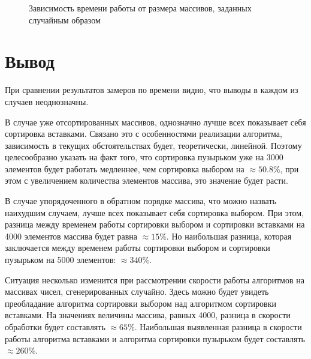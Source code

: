 \documentclass[12pt]{report}
\begin{document}
\begin{figure}[h]
\begin{center}
	\captionsetup{justification=centering}
	\caption{Зависимость времени работы от размера массивов, заданных случайным образом}
	\label{timeRes3}
	\end{center}
\end{figure}

\newpage

\section*{Вывод}
При сравнении результатов замеров по времени видно, что выводы в каждом из случаев неоднозначны.

В случае уже отсортированных массивов, однозначно лучше всех показывает себя сортировка вставками. Связано это с особенностями реализации алгоритма, зависимость в текущих обстоятельствах будет, теоретически, линейной. Поэтому целесообразно указать на факт того, что сортировка пузырьком уже на 3000 элементов будет работать медленнее, чем сортировка выбором на  $\approx 50.8 \%$, при этом с увеличением количества элементов массива, это значение будет расти.

В случае упорядоченного в обратном порядке массива, что можно назвать наихудшим случаем, лучше всех показывает себя сортировка выбором. При этом, разница между временем работы сортировки выбором и сортировки вставками на 4000 элементов массива будет равна $\approx 15\%$. Но наибольшая разница, которая заключается между временем работы сортировки выбором и сортировки пузырьком на 5000 элементов: $\approx 340\%$.

Ситуация несколько изменится при рассмотрении скорости работы алгоритмов на массивах чисел, сгенерированных случайно. Здесь можно будет увидеть преобладание алгоритма сортировки выбором над алгоритмом сортировки вставками. На значениях величины массива, равных 4000, разница в скорости обработки будет составлять $\approx 65\%$. Наибольшая выявленная разница в скорости работы алгоритма вставками и алгоритма сортировки пузырьком будет составлять $\approx 260\%$.
\end{document}

